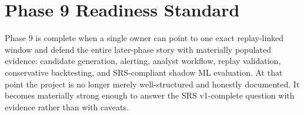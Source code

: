 \documentclass{article}
\begin{document}
\section*{Phase 9 Readiness Standard}
Phase 9 is complete when a single owner can point to one exact replay-linked window and defend the entire later-phase story with materially populated evidence: candidate generation, alerting, analyst workflow, replay validation, conservative backtesting, and SRS-compliant shadow ML evaluation. At that point the project is no longer merely well-structured and honestly documented. It becomes materially strong enough to answer the SRS v1-complete question with evidence rather than with caveats.
\end{document}
